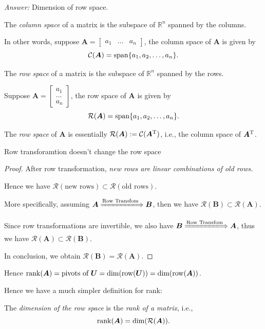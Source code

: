 \textit{Answer: }Dimension of row space.
\begin{definition}
The \emph{column space} of a matrix is the subspace of $\mathbb{R}^{n}$ spanned by the columns.

In other words, suppose $\bm A = \left[\begin{array}{c|c|c}
a_1&\dots&a_n
\end{array}\right]$, the column space of $\bm A$ is given by
\[
\mathcal{C}(\bm A) =\operatorname{span}\{a_1,a_2,\dots,a_n\}.
\]
\end{definition}
\begin{definition}
The \emph{row space} of a matrix is the subspace of $\mathbb{R}^{n}$ spanned by the rows.

Suppose $\bm A = \left[\begin{array}{c}
a_1\\
\hline
\dots\\
\hline
a_n
\end{array}\right]$, the row space of $\bm A$ is given by
\[
\mathcal{R}(\bm A) = \operatorname{span}\{a_1,a_2,\dots,a_n\}.
\]

The \emph{row space} of $\bm A$ is essentially $\mathcal{R}(\bm A):=\mathcal{C}(\bm A^{\mathrm T})$, i.e., the column space of $\bm A^{\mathrm T}$.
\end{definition}
\begin{proposition}\label{row_transformation}
Row transforamtion doesn't change the row space
\end{proposition}
\begin{proof}
After row transformation, \emph{new rows are linear combinations of old rows.}

Hence we have $\mathcal{R}(\mbox{new rows}) \subset\mathcal{R}(\mbox{old rows})$.

More specifically, assuming $\bm A\xLongrightarrow{\text{Row Transfom}}\bm B$, then we have $\mathcal{R}(\bm B)\subset\mathcal{R}(\bm A)$.

Since row transformations are invertible, we also have $\bm B\xLongrightarrow{\text{Row Transfom}}\bm A$, thus we have $\mathcal{R}(\bm A)\subset\mathcal{R}(\bm B)$.

In conclusion, we obtain $\mathcal{R}(\bm B)=\mathcal{R}(\bm A)$.
\end{proof}

Hence $\operatorname{rank}(\bm A) = \text{pivots of $\bm U$} = \dim(\operatorname{row}(\bm U)) = \dim(\operatorname{row}(\bm A))$.

Hence we have a much simpler definition for rank:
\begin{definition}[rank]
The \emph{dimension of the row space} is the \emph{rank of a matrix}, i.e.,
\[
\operatorname{rank}(\bm A) = \dim(\mathcal{R}(\bm A)).
\]
\end{definition}

